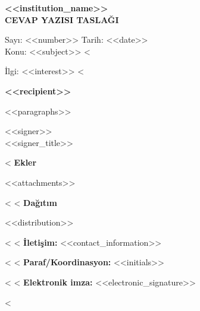 \documentclass[11pt,a4paper]{article}
\begin{document}
\begin{center}{\bfseries <<institution_name>>\\}{\bfseries CEVAP YAZISI TASLAĞI}\end{center}
\noindent Sayı: <<number>> \hfill Tarih: <<date>>\\
\noindent Konu: <<subject>>
<%
\par\noindent İlgi: <<interest>>
<%
\vspace{8mm}
\begin{center}\bfseries <<recipient>>\end{center}
<<paragraphs>>
\vspace{10mm}
\begin{flushright}<<signer>>\\<<signer_title>>\end{flushright}
<%
\noindent\textbf{Ekler}
\begin{enumerate}[leftmargin=*]
<<attachments>>
\end{enumerate}
<%
<%
\noindent\textbf{Dağıtım}
\begin{itemize}[leftmargin=*]
<<distribution>>
\end{itemize}
<%
<%
\noindent\textbf{İletişim:} <<contact_information>>\par
<%
<%
\noindent\textbf{Paraf/Koordinasyon:} <<initials>>\par
<%
<%
\noindent\textbf{Elektronik imza:} <<electronic_signature>>\par
<%
\end{document}
